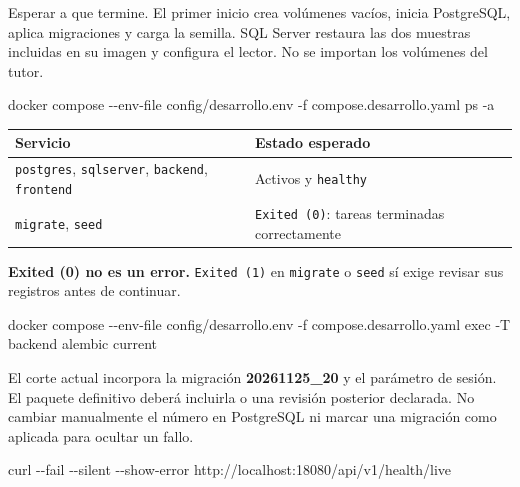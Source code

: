 \documentclass[
  spanish,
  10pt,
  a4paper,
]{article}
\newenvironment{Shaded}{}{}
\newcommand{\AttributeTok}[1]{#1}
\newcommand{\ExtensionTok}[1]{#1}
\newcommand{\NormalTok}[1]{#1}
\renewenvironment{Shaded}{\begin{snugshade}}{\end{snugshade}}%
\begin{document}
Esperar a que termine. El primer inicio crea volúmenes vacíos, inicia
PostgreSQL, aplica migraciones y carga la semilla. SQL Server restaura
las dos muestras incluidas en su imagen y configura el lector. No se
importan los volúmenes del tutor.

\begin{Shaded}
\begin{Highlighting}[]
\ExtensionTok{docker}\NormalTok{ compose }\AttributeTok{{-}{-}env{-}file}\NormalTok{ config/desarrollo.env }\AttributeTok{{-}f}\NormalTok{ compose.desarrollo.yaml ps }\AttributeTok{{-}a}
\end{Highlighting}
\end{Shaded}

\begin{longtable}[]{@{}ll@{}}
\toprule\noalign{}
Servicio & Estado esperado \\
\midrule\noalign{}
\endhead
\bottomrule\noalign{}
\endlastfoot
\texttt{postgres}, \texttt{sqlserver}, \texttt{backend},
\texttt{frontend} & Activos y \texttt{healthy} \\
\texttt{migrate}, \texttt{seed} & \texttt{Exited\ (0)}: tareas
terminadas correctamente \\
\end{longtable}

\textbf{Exited (0) no es un error.} \texttt{Exited\ (1)} en
\texttt{migrate} o \texttt{seed} sí exige revisar sus registros antes de
continuar.

\begin{Shaded}
\begin{Highlighting}[]
\ExtensionTok{docker}\NormalTok{ compose }\AttributeTok{{-}{-}env{-}file}\NormalTok{ config/desarrollo.env }\AttributeTok{{-}f}\NormalTok{ compose.desarrollo.yaml exec }\AttributeTok{{-}T}\NormalTok{ backend alembic current}
\end{Highlighting}
\end{Shaded}

El corte actual incorpora la migración \textbf{20261125\_20} y el
parámetro de sesión. El paquete definitivo deberá incluirla o una
revisión posterior declarada. No cambiar manualmente el número en
PostgreSQL ni marcar una migración como aplicada para ocultar un fallo.

\begin{Shaded}
\begin{Highlighting}[]
\ExtensionTok{curl} \AttributeTok{{-}{-}fail} \AttributeTok{{-}{-}silent} \AttributeTok{{-}{-}show{-}error}\NormalTok{ http://localhost:18080/api/v1/health/live}
\end{Highlighting}
\end{Shaded}
\end{document}
